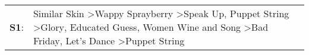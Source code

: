 \begin{supertabular}{p{0.03\textwidth}p{0.92\textwidth}}
 \textbf{S1}:  &  Similar Skin\textsuperscript{} \textgreater \enspace Wappy Sprayberry\textsuperscript{} \textgreater \enspace Speak Up\textsuperscript{}, \enspace Puppet String\textsuperscript{} \textgreater \enspace Glory\textsuperscript{}, \enspace Educated Guess\textsuperscript{}, \enspace Women Wine and Song\textsuperscript{} \textgreater \enspace Bad Friday\textsuperscript{}, \enspace Let's Dance\textsuperscript{} \textgreater \enspace Puppet String\textsuperscript{}  \enspace  \\
\end{supertabular}
